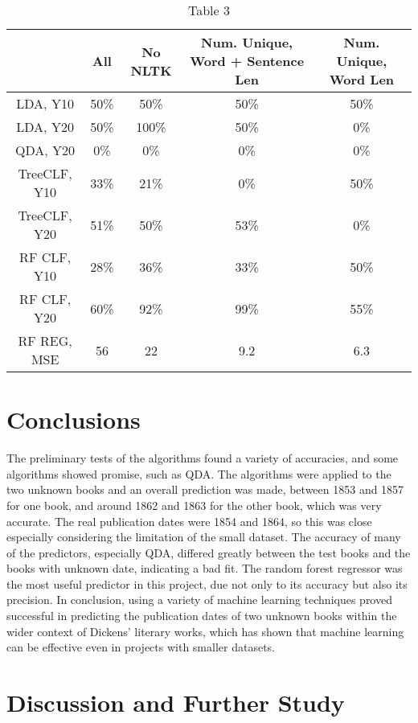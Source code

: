 \documentclass[11pt,a4paper,reqno]{amsart}
\begin{document}
\begin{center}
\begin{table}
\begin{tabular}{ |c|c|c|c|c| } 
 \hline
  & All & No NLTK & Num. Unique, Word + Sentence Len & Num. Unique, Word Len  \\
 \hline
 LDA, Y10 & 50\% & 50\% & 50\% & 50\%   \\
 LDA, Y20 & 50\% & 100\% & 50\% & 0\%   \\
 QDA, Y20 & 0\% & 0\% & 0\% & 0\%   \\
 TreeCLF, Y10 & 33\% & 21\% & 0\% & 50\%   \\
 TreeCLF, Y20 & 51\% & 50\% & 53\% & 0\%   \\
 RF CLF, Y10 & 28\% & 36\% & 33\% & 50\%   \\
 RF CLF, Y20 & 60\% & 92\% & 99\% & 55\%   \\
 RF REG, MSE & 56 & 22 & 9.2 & 6.3   \\
 \hline
\end{tabular}
\caption*{Table 3}
\end{table}
\end{center}



\section{Conclusions}
The preliminary tests of the algorithms found a variety of accuracies, and some algorithms showed promise, such as QDA. The algorithms were applied to the two unknown books and an overall prediction was made, between 1853 and 1857 for one book, and around 1862 and 1863 for the other book, which was very accurate. The real publication dates were 1854 and 1864, so this was close especially considering the limitation of the small dataset. The accuracy of many of the predictors, especially QDA, differed greatly between the test books and the books with unknown date, indicating a bad fit. The random forest regressor was the most useful predictor in this project, due not only to its accuracy but also its precision. In conclusion, using a variety of machine learning techniques proved successful in predicting the publication dates of two unknown books within the wider context of Dickens' literary works, which has shown that machine learning can be effective even in projects with smaller datasets. 


\section{Discussion and Further Study}
\end{document}
